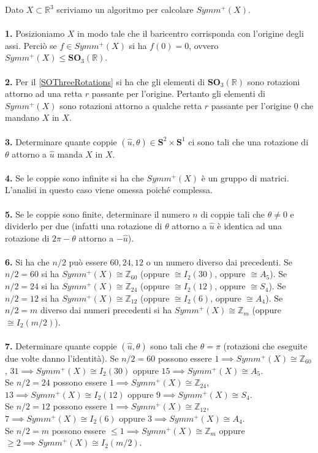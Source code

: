 \documentclass[oneside, 11pt]{amsbook}
\newcommand{\0}{{(0)}}
\newcommand{\3}{{(3)}}
\theoremstyle{colonplain}
\theoremstyle{colondefinition}
\theoremstyle{colonremark}
\numberwithin{equation}{chapter}
\begin{document}
Dato $X \subset \mathbb{R}^3$ scriviamo un algoritmo per calcolare $Symm^+(X)$. \\ \\
\textbf{1.} Posizioniamo $X$ in modo tale che il baricentro corrisponda con l'origine degli assi. Perciò se $f \in Symm^+(X)$ si ha $f(0) = 0$, ovvero $Symm^+(X) \leq \mathbf{SO}_3(\mathbb{R})$. \\ \\
\textbf{2.} Per il \cref{SOThreeRotations} si ha che gli elementi di $\mathbf{SO}_3(\mathbb{R})$ sono rotazioni attorno ad una retta $r$ passante per l'origine. Pertanto gli elementi di $Symm^+(X)$ sono rotazioni attorno a qualche retta $r$ passante per l'origine $\underline{0}$ che mandano $X$ in $X$. \\ \\
\textbf{3.} Determinare quante coppie $(\hat{u}, \theta) \in \mathbf{S}^2 \times \mathbf{S}^1$ ci sono tali che una rotazione di $\theta$ attorno a $\hat{u}$ manda $X$ in $X$. \\ \\
\textbf{4.} Se le coppie sono infinite si ha che $Symm^+(X)$ è un gruppo di matrici. L'analisi in questo caso viene omessa poiché complessa. \\ \\
\textbf{5.} Se le coppie sono finite, determinare il numero $n$ di coppie tali che $\theta \neq 0$ e dividerlo per due (infatti una rotazione di $\theta$ attorno a $\hat{u}$ è identica ad una rotazione di $2\pi - \theta$ attorno a $-\hat{u}$). \\ \\
\textbf{6.} Si ha che $n/2$ può essere $60, 24, 12$ o un numero diverso dai precedenti. Se $n/2 = 60$ si ha $Symm^+(X) \cong \mathbb{Z}_{60}$ (oppure $\cong I_2(30)$, oppure $\cong A_5$). Se $n/2 = 24$ si ha $Symm^+(X) \cong \mathbb{Z}_{24}$ (oppure $\cong I_2(12)$, oppure $\cong S_4$). Se $n/2 = 12$ si ha $Symm^+(X) \cong \mathbb{Z}_{12}$ (oppure $\cong I_2(6)$, oppure $\cong A_4$). Se $n/2 = m$ diverso dai numeri precedenti si ha $Symm^+(X) \cong \mathbb{Z}_m$ (oppure $\cong I_2(m/2)$). \\ \\
\textbf{7.} Determinare quante coppie $(\hat{u}, \theta)$ sono tali che $\theta = \pi$ (rotazioni che eseguite due volte danno l'identità). Se $n/2 = 60$ possono essere $1 \implies Symm^+(X) \cong \mathbb{Z}_{60}$, $31 \implies Symm^+(X) \cong I_2(30)$ oppure $15 \implies Symm^+(X) \cong A_5$. \\
Se $n/2 = 24$ possono essere $1 \implies Symm^+(X) \cong \mathbb{Z}_{24}$, $13 \implies Symm^+(X) \cong I_2(12)$ oppure $9 \implies Symm^+(X) \cong S_4$. \\
Se $n/2 = 12$ possono essere $1 \implies Symm^+(X) \cong \mathbb{Z}_{12}$, $7 \implies Symm^+(X) \cong I_2(6)$ oppure $3 \implies Symm^+(X) \cong A_4$. \\
Se $n/2 = m$ possono essere $\leq 1 \implies Symm^+(X) \cong \mathbb{Z}_m$ oppure $\geq 2 \implies Symm^+(X) \cong I_2(m/2)$.
\end{document}
